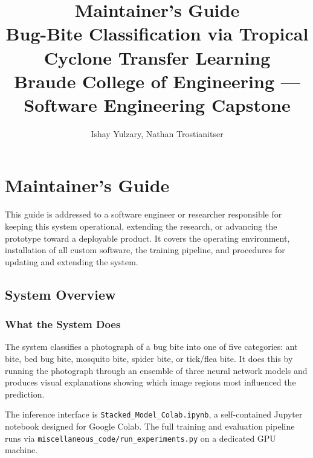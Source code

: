 \documentclass[12pt,a4paper]{article}
\begin{document}
\title{Maintainer's Guide\\
       \large Bug-Bite Classification via Tropical Cyclone Transfer Learning\\
       Braude College of Engineering --- Software Engineering Capstone}
\author{Ishay Yulzary, Nathan Trostianitser}
\date{}
\maketitle
\tableofcontents
\newpage

\section{Maintainer's Guide}
\label{app:maintainer-guide}

This guide is addressed to a software engineer or researcher responsible for
keeping this system operational, extending the research, or advancing the
prototype toward a deployable product. It covers the operating environment,
installation of all custom software, the training pipeline, and procedures
for updating and extending the system.

\subsection{System Overview}
\label{sec:mg-overview}

\subsubsection{What the System Does}

The system classifies a photograph of a bug bite into one of five categories:
ant bite, bed bug bite, mosquito bite, spider bite, or tick/flea bite. It does
this by running the photograph through an ensemble of three neural network
models and produces visual explanations showing which image regions most
influenced the prediction.

The inference interface is \texttt{Stacked\_Model\_Colab.ipynb}, a
self-contained Jupyter notebook designed for Google Colab. The full training
and evaluation pipeline runs via \texttt{miscellaneous\_code/run\_experiments.py}
on a dedicated GPU machine.


\end{document}
